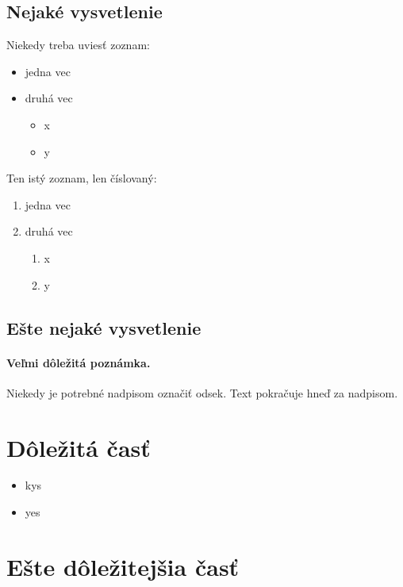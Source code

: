 \documentclass[10pt,slovak,a4paper]{IEEEtran}
\begin{document}
\subsection{Nejaké vysvetlenie} \label{ina:nejake}

Niekedy treba uviesť zoznam:

\begin{itemize}
\item jedna vec
\item druhá vec
	\begin{itemize}
	\item x
	\item y
	\end{itemize}
\end{itemize}

Ten istý zoznam, len číslovaný:

\begin{enumerate}
\item jedna vec
\item druhá vec
	\begin{enumerate}
	\item x
	\item y
	\end{enumerate}
\end{enumerate}


\subsection{Ešte nejaké vysvetlenie} \label{ina:este}

\paragraph{Veľmi dôležitá poznámka.}
Niekedy je potrebné nadpisom označiť odsek. Text pokračuje hneď za nadpisom.



\section{Dôležitá časť} \label{dolezita}

\begin{itemize}
\item kys
\item yes
\end{itemize}


\section{Ešte dôležitejšia časť} \label{dolezitejsia}
\end{document}
